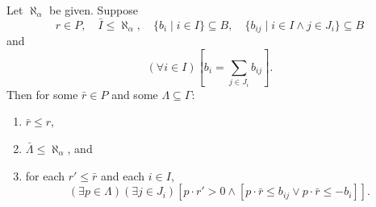 Let $\aleph_\alpha$ be given. Suppose
$$r \in P, \quad \bar{I} \leq \aleph_\alpha, \quad \{b_i \mid i \in I\} \subseteq B, \quad \{b_{ij} \mid i \in I \land j \in J_i\} \subseteq B$$
and
$$(\forall i \in I) \left[ b_i = \sum_{j \in J_i} b_{ij} \right].$$
Then for some $\bar{r} \in P$ and some $\Lambda \subseteq \Gamma$:
\begin{enumerate}
\item $\bar{r} \leq r$,
\item $\bar{\Lambda} \leq \aleph_\alpha$, and
\item for each $r' \leq \bar{r}$ and each $i \in I$,
$$(\exists p \in \Lambda)(\exists j \in J_i) [p \cdot r' > 0 \land [p \cdot \bar{r} \leq b_{ij} \lor p \cdot \bar{r} \leq -b_i]].$$
\end{enumerate}
